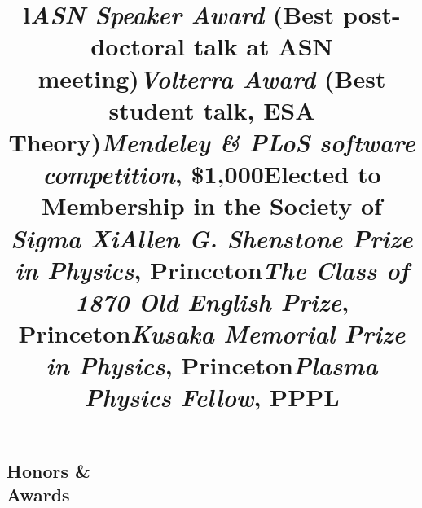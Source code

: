 \documentclass[margin]{res}
\begin{document}
\begin{resume}
\section{Honors \& \\ Awards}
\begin{format}
\title{l}\\
\body
\end{format}

\title{\emph{ASN Speaker Award} (Best post-doctoral talk at ASN meeting)}
\begin{position} \vspace{-.8cm} \end{position}

\title{\emph{Volterra Award} (Best student talk, ESA Theory)}
\begin{position} \vspace{-.8cm} \end{position}

\title{\emph{Mendeley \& PLoS software competition}, \$1,000}
\begin{position} \vspace{-.8cm} \end{position}

\title{Elected to Membership in the Society of \emph{Sigma Xi}}
\begin{position}   \vspace{-.8cm} \end{position}

\title{\emph{Allen G. Shenstone Prize in Physics}, Princeton}
\begin{position}   \vspace{-.8cm} \end{position}

\title{\emph{The Class of 1870 Old English Prize},  Princeton}
\begin{position}   \vspace{-.8cm} \end{position}

\title{\emph{Kusaka Memorial Prize in Physics}, Princeton}
\begin{position}   \vspace{-.8cm} \end{position}

\title{\emph{Plasma Physics Fellow},  PPPL }
\begin{position}   \vspace{-.8cm} \end{position}




\end{resume}
\end{document}
